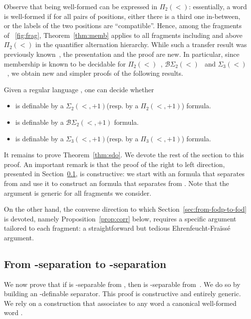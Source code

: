 \documentclass[a4paper,USenglish]{lipics}
\newcommand{\efgame}{Ehrenfeucht-Fra\"iss\'e\xspace}
\newcommand{\sio}[1]{\ensuremath{\Sigma_{#1}(<)}\xspace}
\newcommand{\pio}[1]{\ensuremath{\Pi_{#1}(<)}\xspace}
\newcommand{\bso}[1]{\ensuremath{\mathcal{B}\Sigma_{#1}(<)}\xspace}
\newcommand{\sdp}{\ensuremath{\Sigma_{2}(<,+1)}\xspace}
\newcommand{\bdp}{\ensuremath{\mathcal{B}\Sigma_{2}(<,+1)}\xspace}
\newcommand{\stp}{\ensuremath{\Sigma_{3}(<,+1)}\xspace}
\newcommand{\pdp}{\ensuremath{\Pi_{2}(<,+1)}\xspace}
\newcommand{\ptp}{\ensuremath{\Pi_{3}(<,+1)}\xspace}
\theoremstyle{plain}
\begin{document}
Observe that being well-formed  can be expressed in \pio{2}:
essentially, a word is well-formed if for all pairs of positions,
either there is a third one in-between, or the labels of the two
positions are ``compatible''. Hence, among the fragments of
\figurename~\ref{fig:frag}, Theorem~\ref{thm:memb} applies to all
fragments including and above \pio{2} in the quantifier alternation
hierarchy. While such a transfer result was previously
known~\cite{Str85,pw:wreath}, the presentation and the proof are
new. In particular, since membership is known to be decidable for
\pio{2}~\cite{pwdelta}, \bso{2}~\cite{PZ:icalp14} and
\sio{3}~\cite{PZ:icalp14}, we obtain new and simpler proofs of the
following results.

\begin{corollary} \label{cor:memb}
  Given a regular language , one can decide whether
  \begin{itemize}
  \item  is definable by a \sdp (resp. by a \pdp) formula.
  \item  is definable by a \bdp formula.
  \item  is definable by a \stp (resp. by a \ptp) formula.
  \end{itemize}
\end{corollary}



It remains to prove Theorem~\ref{thm:sdo}. We devote the rest of the section
to this proof. An important remark is that the proof of the right to left
direction, presented in Section~\ref{sec:from-fod-to-fodp}, is constructive:
we start with an  formula that separates  from  and use it
to construct an  formula that separates  from . Note that the
argument is generic for all fragments we consider.

On the other hand, the converse direction to which
Section~\ref{sec:from-fodp-to-fod} is devoted, namely
Proposition~\ref{prop:corr} below, requires a specific argument tailored to
each fragment: a straightforward but tedious \efgame argument.

\subsection{\texorpdfstring{From -separation to -separation}{From F-separation to F+-separation}}
\label{sec:from-fod-to-fodp}

We now prove that if  is -separable from , then  is
-separable from~. We do so by building an -definable
separator. This proof is constructive and entirely generic. We rely on a construction
that associates to any word 
a canonical well-formed word .
\end{document}
